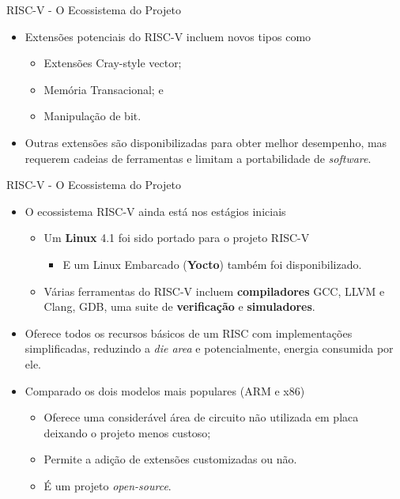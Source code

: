 \documentclass[aspectratio=169]{beamer}
\begin{document}
\begin{frame}{RISC-V - O Ecossistema do Projeto}
	\begin{itemize}
		\item Extensões potenciais do RISC-V incluem novos tipos como
		\begin{itemize}
			\item Extensões Cray-style vector;
			\item Memória Transacional; e
			\item Manipulação de bit.
		\end{itemize}

		\item Outras extensões são disponibilizadas para obter melhor desempenho, mas requerem cadeias de ferramentas e limitam a portabilidade de \textit{software}.

	\end{itemize}
\end{frame}

\begin{frame}{RISC-V - O Ecossistema do Projeto}
	\begin{itemize}
		\item O ecossistema RISC-V ainda está nos estágios iniciais
		\begin{itemize}
			\item Um \textbf{Linux} 4.1 foi sido portado para o projeto RISC-V
			\begin{itemize}
				\item E um Linux Embarcado (\textbf{Yocto}) também foi disponibilizado.
			\end{itemize}
			\item Várias ferramentas do RISC-V incluem \textbf{compiladores} GCC, LLVM e Clang, GDB, uma suite de \textbf{verificação} e \textbf{simuladores}.
		\end{itemize}
		\item Oferece todos os recursos básicos de um RISC com implementações simplificadas, reduzindo a \textit{die area} e potencialmente, energia consumida por ele.
		\item Comparado os dois modelos mais populares (ARM e x86)
		\begin{itemize}
			\item Oferece uma considerável área de circuito não utilizada em placa deixando o projeto menos custoso;
			\item Permite a adição de extensões customizadas ou não.
			\item É um projeto \textit{open-source}.
		\end{itemize}
	\end{itemize}
\end{frame}
\end{document}
